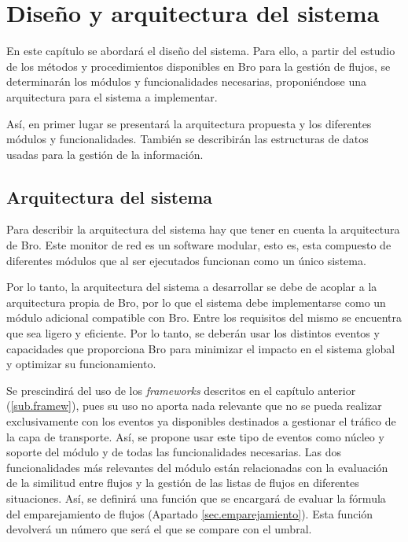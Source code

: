 \chapter{Diseño y arquitectura del sistema}\label{diseno}

En este capítulo se abordará el diseño del sistema. Para ello, a partir del estudio de los métodos y procedimientos disponibles en 
Bro para la gestión de flujos, se determinarán los módulos y funcionalidades necesarias, proponiéndose una arquitectura para el 
sistema a implementar.

\intro Así, en primer lugar se presentará la arquitectura propuesta y los diferentes módulos y funcionalidades. También se describirán 
las estructuras de datos usadas para la gestión de la información.

\section{Arquitectura del sistema}

Para describir la arquitectura del sistema hay que tener en cuenta la arquitectura de Bro. Este monitor de red es un software modular, 
esto es, esta compuesto de diferentes módulos que al ser ejecutados funcionan como un único sistema.

\intro Por lo tanto, la arquitectura del sistema a desarrollar se debe de acoplar a la arquitectura propia de Bro, por lo que el 
sistema debe implementarse como un módulo adicional compatible con Bro. Entre los requisitos del mismo se encuentra que sea ligero y 
eficiente. Por lo tanto, se deberán usar los distintos eventos y capacidades que proporciona Bro para minimizar el impacto en el 
sistema global y optimizar su funcionamiento.

\intro Se prescindirá del uso de los \textit{frameworks} descritos en el capítulo anterior (\ref{sub.framew}), pues su uso no aporta 
nada relevante que no se pueda realizar exclusivamente con los eventos ya disponibles destinados a gestionar el tráfico de la capa de 
transporte. Así, se propone usar este tipo de eventos como núcleo y soporte del módulo y de todas las funcionalidades necesarias. Las 
dos funcionalidades más relevantes del módulo están relacionadas con la evaluación de la similitud entre flujos y la gestión de las 
listas de flujos en diferentes situaciones. Así, se definirá una función que se encargará de evaluar la fórmula del emparejamiento de 
flujos (Apartado \ref{sec.emparejamiento}). Esta función devolverá un número que será el que se compare con el umbral.

